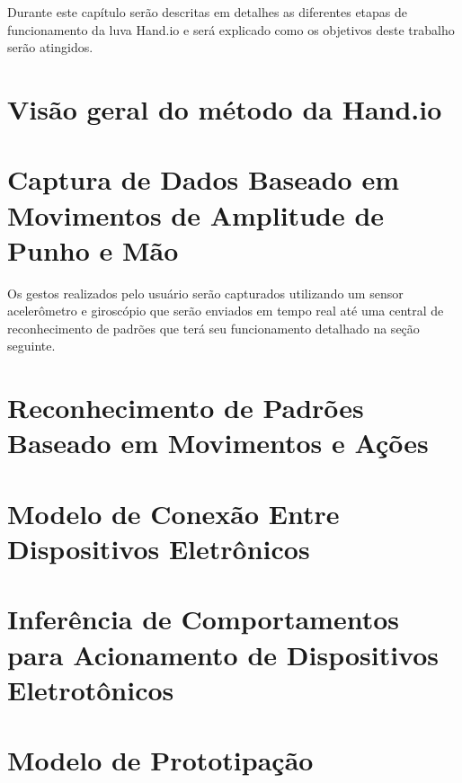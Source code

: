 Durante este capítulo serão descritas em detalhes as diferentes etapas de funcionamento da luva Hand.io e será explicado como os objetivos deste trabalho serão atingidos.

\section{Visão geral do método da Hand.io}












\section{Captura de Dados Baseado em Movimentos de Amplitude de Punho e Mão}

Os gestos realizados pelo usuário serão capturados utilizando um sensor acelerômetro e giroscópio que serão enviados em tempo real até uma central de reconhecimento de padrões que terá seu funcionamento detalhado na seção seguinte. 



\section{Reconhecimento de Padrões Baseado em Movimentos e Ações}



\section{Modelo de Conexão Entre Dispositivos Eletrônicos}

\section{Inferência de Comportamentos para Acionamento de Dispositivos Eletrotônicos}

\section{Modelo de Prototipação}

